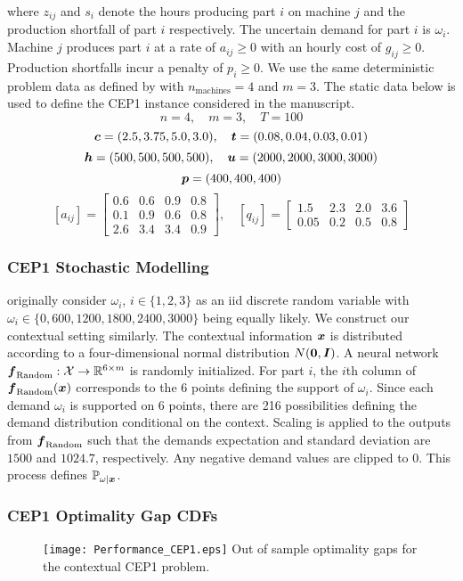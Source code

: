  where $z_{ij}$ and $s_i$ denote the hours producing part $i$ on machine $j$ and the production shortfall of part $i$ respectively. The uncertain demand for part $i$ is $\omega_i$. Machine $j$ produces part $i$ at a rate of $a_{ij} \geq 0$ with an hourly cost of $g_{ij} \geq 0$. Production shortfalls incur a penalty of $p_i \geq 0$. We use the same deterministic problem data as defined by \citep{higle_sen_1996} with $n_{\text{machines}} = 4$ and $m = 3$. The static data below is used to define the CEP1 instance considered in the manuscript. 
\[
n = 4, \quad m = 3, \quad T = 100
\]
\[
\boldsymbol{c} = (2.5, 3.75, 5.0, 3.0), \quad \boldsymbol{t} = (0.08, 0.04, 0.03, 0.01)
\]
\[
\boldsymbol{h} = (500, 500, 500, 500), \quad \boldsymbol{u} = (2000, 2000, 3000, 3000)
\]
\[
\boldsymbol{p} = (400, 400, 400)
\]
\[
[a_{ij}] = \begin{bmatrix}
0.6 & 0.6 & 0.9 & 0.8 \\
0.1 & 0.9 & 0.6 & 0.8 \\
2.6 & 3.4 & 3.4 & 0.9
\end{bmatrix}, \quad 
[q_{ij}] = \begin{bmatrix}
1.5 & 2.3 & 2.0 & 3.6 \\
0.05 & 0.2 & 0.5 & 0.8
\end{bmatrix}
\]
\subsubsection{CEP1 Stochastic Modelling} \label{appendix:cep1_data_generation}
\citet{higle_sen_1996} originally consider $\omega_i$, $ i \in \{1,2,3\}$ as an iid discrete random variable with $\omega_i \in \{0, 600, 1200, 1800, 2400, 3000\}$ being equally likely. We construct our contextual setting similarly. The contextual information $\boldsymbol{x}$ is distributed according to a four-dimensional normal distribution $N(\boldsymbol{0}, \boldsymbol{I})$. A neural network $\boldsymbol{f}_{\text{Random}} : \mathcal{X} \rightarrow \mathbb{R}^{6 \times m}$ is randomly initialized. For part $i$, the $i$th column of $\boldsymbol{f}_{\text{Random}}(\boldsymbol{x})$ corresponds to the $6$ points defining the support of $\omega_i$. Since each demand $\omega_i$ is supported on 6 points, there are 216 possibilities defining the demand distribution conditional on the context. Scaling is applied to the outputs from $\boldsymbol{f}_{\text{Random}}$ such that the demands expectation and standard deviation are $1500$ and $1024.7$, respectively. Any negative demand values are clipped to 0. This process defines $\mathbb{P}_{\omega | \boldsymbol{x}}$. 


\subsubsection{CEP1 Optimality Gap CDFs}\label{appendix:cep1_performance}
\begin{figure}[h]
    \FIGURE
    {\texttt{[image: Performance\_CEP1.eps]}}
    {Out of sample optimality gaps for the contextual CEP1 problem.\label{fig:cep1_gaps}}
    {}
\end{figure}

